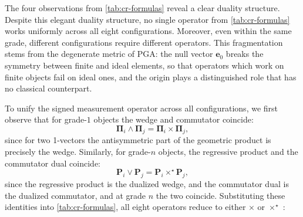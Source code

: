 \documentclass{birkjour}
\theoremstyle{definition}
\theoremstyle{remark}
\begin{document}
The four observations from \cref{tab:cr-formulas} reveal a clear
duality structure.
Despite this elegant duality structure, no single operator from \cref{tab:cr-formulas} works uniformly across all eight configurations. Moreover, even within the same grade, different configurations require different operators. This fragmentation stems from the degenerate metric of PGA: the null vector $\mathbf{e}_0$ breaks the symmetry between finite and ideal elements, so that operators which work on finite objects fail on ideal ones, and the origin plays a distinguished role that has no classical counterpart.

To unify the signed measurement operator across all configurations, we first observe that for grade-$1$ objects the wedge and commutator
coincide:
\begin{equation}
  \boldsymbol{\Pi}_i \wedge \boldsymbol{\Pi}_j
  = \boldsymbol{\Pi}_i \times \boldsymbol{\Pi}_j,
\end{equation}
since for two 1-vectors the antisymmetric part of the geometric product is precisely the wedge. Similarly, for grade-$n$ objects, the regressive product and the commutator dual coincide:
\begin{equation}
  \mathbf{P}_i \vee \mathbf{P}_j
  = \mathbf{P}_i \times^\star \mathbf{P}_j,
\end{equation}
since the regressive product is the dualized wedge, and the commutator dual is the dualized commutator, and at grade $n$ the two coincide. Substituting these identities into \cref{tab:cr-formulas}, all eight operators reduce to either $\times$ or $\times^\star$ :
\end{document}
